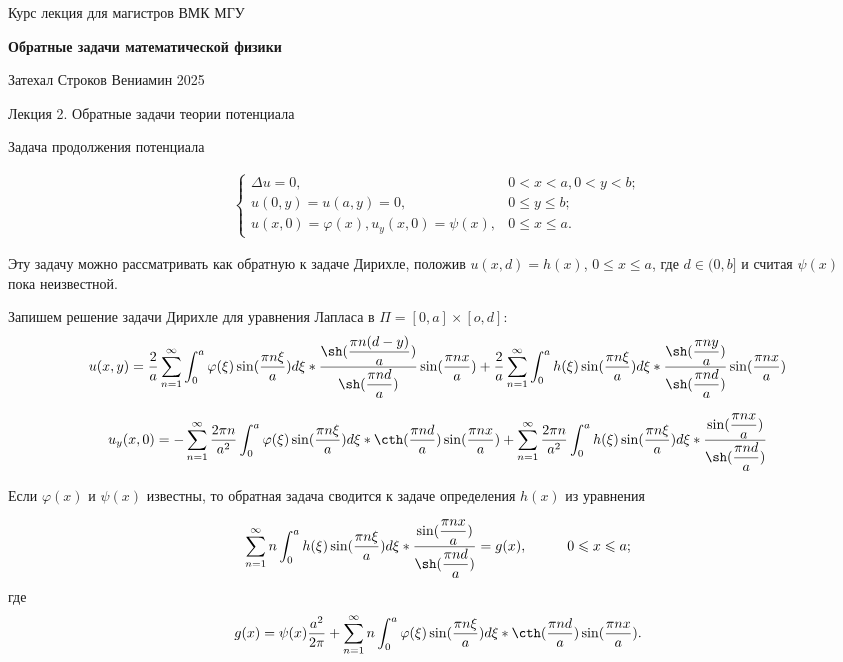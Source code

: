 \documentclass{article}
\begin{document}
\centerline{\large Курс лекция для магистров ВМК МГУ}
\centerline {\textbf{\LARGE Обратные задачи математической физики}}
\centerline {Затехал Строков Вениамин 2025}

\vspace{0.4cm}

\centerline{\LARGE Лекция 2. Обратные задачи теории потенциала}

\vspace{1cm}
\centerline{\large Задача продолжения потенциала}

\begin{align}
\begin{cases}
\Delta u = 0, & 0 < x < a, 0 < y < b;\\
u(0,y) = u(a,y) = 0, & 0 \leqslant y \leqslant b;\\
u(x,0) = \varphi(x), u_y(x,0) = \psi(x), & 0 \leqslant x \leqslant a.
\end{cases}
\end{align}

Эту задачу можно рассматривать как обратную к задаче Дирихле, положив $u(x,d) = h(x)$, $0 \leqslant x \leqslant a$, где $d \in (0,b]$ и считая $\psi(x)$ пока неизвестной. 

Запишем решение задачи Дирихле для уравнения Лапласа в $\Pi = [0,a] \times [o,d]$:
\[
u(x,y) = 
\dfrac{2}{a} \sum_{n=1}^{\infty} \int_0^a \varphi(\xi) \sin(\dfrac{ \pi n \xi }{a}) d \xi *
\dfrac{\sh (\dfrac{\pi n (d-y)}{a})}{\sh( \dfrac{\pi n d}{a})} \sin (\dfrac{\pi n x}{a}) +
\dfrac{2}{a} \sum_{n=1}^{\infty} \int_0^a h(\xi) \sin(\dfrac{ \pi n \xi }{a}) d \xi *
\dfrac{\sh (\dfrac{\pi n y}{a})}{\sh (\dfrac{\pi n d}{a})} \sin( \dfrac{\pi n x}{a})
\]

\[ %
u_y(x,0) = 
- \sum_{n=1}^{\infty} \dfrac{2 \pi n}{a^2} \int_0^a \varphi(\xi) \sin(\dfrac{ \pi n \xi }{a}) d \xi*
\cth( \dfrac{\pi n d}{a} )\sin( \dfrac{\pi n x}{a} )+
\sum_{n=1}^{\infty} \dfrac{2 \pi n}{a^2} \int_0^a h(\xi) \sin(\dfrac{ \pi n \xi }{a}) d \xi *
\dfrac{\sin( \dfrac{\pi n x}{a})}{\sh (\dfrac{\pi n d}{a})} 
\]

Если $\varphi(x)$ и $\psi(x)$ известны, то обратная задача сводится к задаче определения $h(x)$ из уравнения

\[
\sum_{n=1}^{\infty} n \int_0^a h(\xi) \sin(\dfrac{ \pi n \xi }{a}) d \xi *
\dfrac{\sin( \dfrac{\pi n x}{a})}{\sh (\dfrac{\pi n d}{a})} = g(x), \hspace{1cm} 0 \leqslant x \leqslant a;
\]
где 
\[
g(x) = \psi(x) \frac{a^2}{2 \pi} + \sum_{n=1}^{\infty} n \int_0^a  \varphi(\xi) \sin(\dfrac{ \pi n \xi }{a}) d \xi* \cth (\dfrac{\pi n d}{a}) \sin (\dfrac{\pi n x}{a}).
\]
\end{document}
